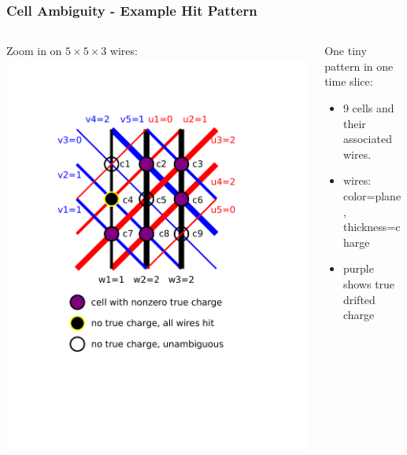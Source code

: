\begin{frame}
  \frametitle{Cell Ambiguity - Example Hit Pattern}

  \begin{columns}
    \begin{column}{0.35\textwidth}
      \begin{center}
        \scriptsize Zoom in on $5 \times 5 \times 3$ wires:
        \includegraphics[width=\textwidth,trim=3.5cm 6cm 5cm 3cm,clip]{example-hit-cells.pdf}        
      \end{center}
    \end{column}
    \begin{column}{0.65\textwidth}
      One tiny pattern in one time slice:
      \begin{itemize}\footnotesize
      \item 9 cells and their associated wires.
      \item wires: color=plane, thickness=charge
      \item purple shows true drifted charge
      \end{itemize}


\end{column}
\end{columns}
\end{frame}
